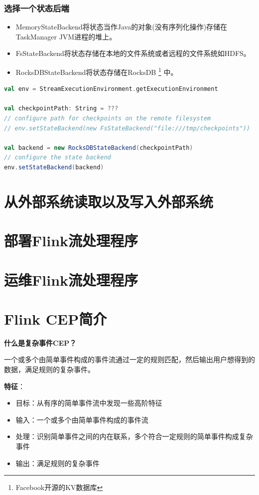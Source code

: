 \documentclass[oneside]{ctexbook}
\begin{document}
\subsection{选择一个状态后端}

\begin{itemize}
\item MemoryStateBackend将状态当作Java的对象(没有序列化操作)存储在TaskManager JVM进程的堆上。
\item FsStateBackend将状态存储在本地的文件系统或者远程的文件系统如HDFS。
\item RocksDBStateBackend将状态存储在RocksDB \footnote{Facebook开源的KV数据库} 中。
\end{itemize}

\begin{lstlisting}[language=scala]
val env = StreamExecutionEnvironment.getExecutionEnvironment

val checkpointPath: String = ???
// configure path for checkpoints on the remote filesystem
// env.setStateBackend(new FsStateBackend("file:///tmp/checkpoints"))

val backend = new RocksDBStateBackend(checkpointPath)
// configure the state backend
env.setStateBackend(backend)
\end{lstlisting}

\chapter{从外部系统读取以及写入外部系统}

\chapter{部署Flink流处理程序}

\chapter{运维Flink流处理程序}

\chapter{Flink CEP简介}

\textbf{什么是复杂事件CEP？}

一个或多个由简单事件构成的事件流通过一定的规则匹配，然后输出用户想得到的数据，满足规则的复杂事件。

\textbf{特征}：

\begin{itemize}
\item 目标：从有序的简单事件流中发现一些高阶特征
\item 输入：一个或多个由简单事件构成的事件流
\item 处理：识别简单事件之间的内在联系，多个符合一定规则的简单事件构成复杂事件
\item 输出：满足规则的复杂事件
\end{itemize}
\end{document}
